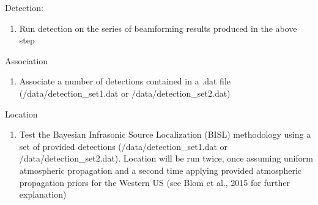\documentclass[letterpaper,10pt,english]{sphinxmanual}
\begin{document}
\begin{sphinxVerbatim}[commandchars=\\\{\}]
  
\end{sphinxVerbatim}

Detection:
\begin{enumerate}
\def\theenumi{\arabic{enumi}}
\def\labelenumi{\theenumi .}
\makeatletter\def\p@enumii{\p@enumi \theenumi .}\makeatother
\item {} 
Run detection on the series of beamforming results produced in the above step

\end{enumerate}

\begin{sphinxVerbatim}[commandchars=\\\{\}]
  
\end{sphinxVerbatim}

Association
\begin{enumerate}
\def\theenumi{\arabic{enumi}}
\def\labelenumi{\theenumi .}
\makeatletter\def\p@enumii{\p@enumi \theenumi .}\makeatother
\item {} 
Associate a number of detections contained in a .dat file (/data/detection\_set1.dat or /data/detection\_set2.dat)

\end{enumerate}

\begin{sphinxVerbatim}[commandchars=\\\{\}]
  
\end{sphinxVerbatim}

Location
\begin{enumerate}
\def\theenumi{\arabic{enumi}}
\def\labelenumi{\theenumi .}
\makeatletter\def\p@enumii{\p@enumi \theenumi .}\makeatother
\item {} 
Test the Bayesian Infrasonic Source Localization (BISL) methodology using a set of provided detections (/data/detection\_set1.dat or /data/detection\_set2.dat).  Location will be run twice, once assuming uniform atmospheric propagation and a second time applying provided atmospheric propagation priors for the Western US (see Blom et al., 2015 for further explanation)

\end{enumerate}
\end{document}
